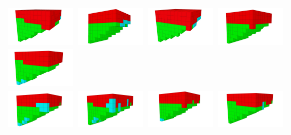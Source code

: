 \begin{figure}
\centering
\begin{subfigure}[b]{1.0\textwidth}
\includegraphics[width=0.19\textwidth]{../Figures/Robots/f_4_g_100.jpg}
\includegraphics[width=0.19\textwidth]{../Figures/Robots/f_4_g_200.jpg}
\includegraphics[width=0.19\textwidth]{../Figures/Robots/f_4_g_300.jpg}
\includegraphics[width=0.19\textwidth]{../Figures/Robots/f_4_g_400.jpg}
\includegraphics[width=0.19\textwidth]{../Figures/Robots/f_4_g_500.jpg}\\
\includegraphics[width=0.19\textwidth]{../Figures/Robots/f_4_g_600.jpg}
\includegraphics[width=0.19\textwidth]{../Figures/Robots/f_4_g_700.jpg}
\includegraphics[width=0.19\textwidth]{../Figures/Robots/f_4_g_800.jpg}
\includegraphics[width=0.19\textwidth]{../Figures/Robots/f_4_g_900.jpg}

\end{subfigure}
\end{figure}
